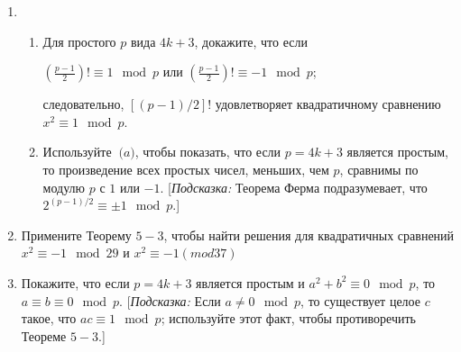 \documentclass[11pt]{article}
\begin{document}
\begin{enumerate}
	\item\begin{enumerate}
		\item Для простого $p$ вида $4k+3$, докажите, что если 
		\begin{center}
			$(\frac{p-1}{2})!\equiv1\mod p$ или $(\frac{p-1}{2})!\equiv-1\mod p$;
		\end{center}
		следовательно, $[(p-1)/2]!$ удовлетворяет квадратичному сравнению $x^2\equiv1\mod p$.
		\item Используйте $\pod a$, чтобы показать, что если $p=4k+3$ является простым, то произведение всех простых чисел, меньших, чем $p$, сравнимы по модулю $p$ с $1$ или $-1$. [\textit{Подсказка:} Теорема Ферма подразумевает, что $2^{(p-1)/2}\equiv\pm1\mod p$.]
		\end{enumerate}
	\item Примените Теорему $5-3$, чтобы найти решения для квадратичных сравнений $x^2\equiv-1\mod 29$ и $x^2\equiv-1(mod 37)$
	\item Покажите, что если $p=4k+3$ является простым и $a^2+b^2\equiv0\mod p$, то $a\equiv b\equiv0\mod p$. [\textit{Подсказка:} Если $a\ne0\mod p$, то существует целое $c$ такое, что $ac\equiv1\mod p$; используйте этот факт, чтобы противоречить Теореме $5-3$.]
\end{enumerate}
\end{document}
